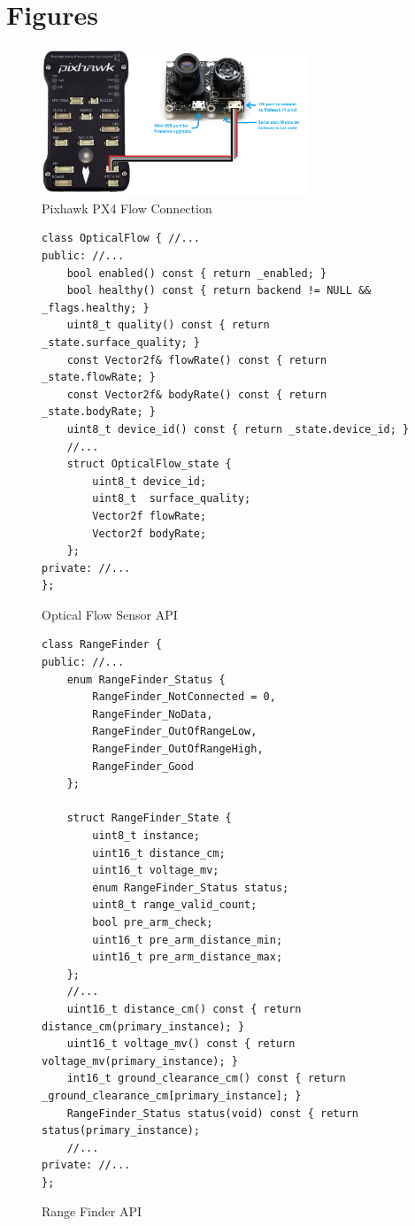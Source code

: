 \section{Figures}
\label{figures}

\begin{figure}[h]
	\centering
    \includegraphics[width=300px]{graphics/PixhawkPX4Flow.png}
	\caption{Pixhawk PX4 Flow Connection}
	\label{fig:pixhawk_px4_flow_connection}
\end{figure}

\begin{figure}[h]
	\begin{lstlisting}[basicstyle=\scriptsize]
class OpticalFlow { //...
public: //...
	bool enabled() const { return _enabled; }
	bool healthy() const { return backend != NULL && _flags.healthy; }
	uint8_t quality() const { return _state.surface_quality; }
	const Vector2f& flowRate() const { return _state.flowRate; }
	const Vector2f& bodyRate() const { return _state.bodyRate; }
	uint8_t device_id() const { return _state.device_id; }
    //...
    struct OpticalFlow_state {
    	uint8_t device_id;
    	uint8_t  surface_quality;
    	Vector2f flowRate;
    	Vector2f bodyRate;
    };
private: //...
};
	\end{lstlisting}
	\caption{Optical Flow Sensor \ac{API}}
	\label{fig:optical_flow_api}
\end{figure}

\begin{figure}[h]
	\begin{lstlisting}[basicstyle=\scriptsize]
class RangeFinder {
public: //...
	enum RangeFinder_Status {
		RangeFinder_NotConnected = 0,
		RangeFinder_NoData,
		RangeFinder_OutOfRangeLow,
		RangeFinder_OutOfRangeHigh,
		RangeFinder_Good
	};
	
	struct RangeFinder_State {
		uint8_t instance;
		uint16_t distance_cm;
		uint16_t voltage_mv;
		enum RangeFinder_Status status;
		uint8_t range_valid_count;
		bool pre_arm_check;
		uint16_t pre_arm_distance_min;
		uint16_t pre_arm_distance_max;
	};
	//...
	uint16_t distance_cm() const { return distance_cm(primary_instance); }
	uint16_t voltage_mv() const { return voltage_mv(primary_instance); }
	int16_t ground_clearance_cm() const { return _ground_clearance_cm[primary_instance]; }
	RangeFinder_Status status(void) const { return status(primary_instance);
	//...
private: //...
};
	\end{lstlisting}
	\caption{Range Finder \ac{API}}
	\label{fig:range_finder_api}
\end{figure}

